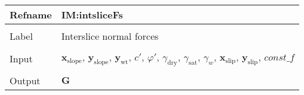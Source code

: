 \documentclass[12pt]{article}
\begin{document}
\vspace{\baselineskip}
\noindent
\begin{minipage}{\textwidth}
\begin{tabular}{>{\raggedright}p{}>{\raggedright\arraybackslash}p{}}
\toprule \textbf{Refname} & \textbf{IM:intsliceFs}
\label{IM:intsliceFs}
\\ \midrule \\
Label & Interslice normal forces
        
\\ \midrule \\
Input & ${\symbf{x}_{\text{slope}}}$, ${\symbf{y}_{\text{slope}}}$, ${\symbf{y}_{\text{wt}}}$, $c'$, $φ'$, ${γ_{\text{dry}}}$, ${γ_{\text{sat}}}$, ${γ_{w}}$, ${\symbf{x}_{\text{slip}}}$, ${\symbf{y}_{\text{slip}}}$, $\mathit{const\_f}$
        
\\ \midrule \\
Output & $\symbf{G}$
         

\end{tabular}
\end{minipage}
\end{document}
